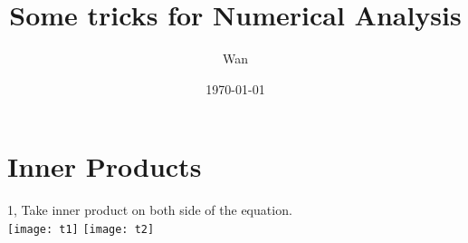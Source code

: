 \documentclass{article}
\begin{document}
\title{Some tricks for Numerical Analysis}
\author{Wan}
\date{\today}
\maketitle

\section{Inner Products}

1, Take inner product on both side of the equation.\\
\texttt{[image: t1]}
\texttt{[image: t2]}
\end{document}
